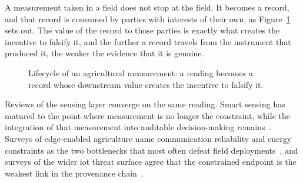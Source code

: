 \documentclass[12pt,a4paper,oneside]{book}
\begin{document}
A measurement taken in a field does not stop at the field. It becomes a record,
and that record is consumed by parties with interests of their own, as
Figure~\ref{fig:lifecycle} sets out. The value of the record to those parties
is exactly what creates the incentive to falsify it, and the further a record
travels from the instrument that produced it, the weaker the evidence that it
is genuine.

\begin{figure}[htbp]
  \centering
  \caption{Lifecycle of an agricultural measurement: a reading becomes a
           record whose downstream value creates the incentive to falsify it.}
  \label{fig:lifecycle}
\end{figure}

Reviews of the sensing layer converge on the same reading. Smart sensing has
matured to the point where measurement is no longer the constraint, while the
integration of that measurement into auditable decision-making
remains~\cite{soussi2024smartsensors, gong2025edge}. Surveys of edge-enabled
agriculture name communication reliability and energy constraints as the two
bottlenecks that most often defeat field deployments~\cite{gong2025edge}, and
surveys of the wider \gls{iot} threat surface agree that the constrained
endpoint is the weakest link in the provenance chain~\cite{aouedi2024surveyintelligent, sahu2024exploringsecurity}.
\end{document}
